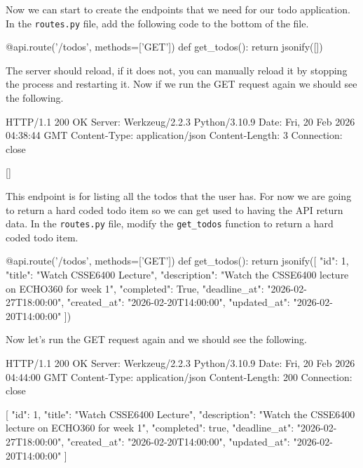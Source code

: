 \documentclass{csse4400}
\begin{document}
Now we can start to create the endpoints that we need for our todo application.
In the \texttt{routes.py} file, add the following code to the bottom of the file.

\begin{code}[language=python]{}
  @api.route('/todos', methods=['GET'])
  def get_todos():
      return jsonify([])
\end{code}

The server should reload, if it does not, you can manually reload it by stopping the process and restarting it.
Now if we run the GET request again we should see the following.

\begin{code}[language=json,numbers=none]{}
  HTTP/1.1 200 OK
  Server: Werkzeug/2.2.3 Python/3.10.9
  Date: Fri, 20 Feb 2026 04:38:44 GMT
  Content-Type: application/json
  Content-Length: 3
  Connection: close
  
  []
\end{code}

This endpoint is for listing all the todos that the user has.
For now we are going to return a hard coded todo item so we can get used to having the API return data.
In the \texttt{routes.py} file, modify the \texttt{get\_todos} function to return a hard coded todo item.

\begin{code}[language=python]{}
  @api.route('/todos', methods=['GET'])
  def get_todos():
      return jsonify([{
        "id": 1,
        "title": "Watch CSSE6400 Lecture",
        "description": "Watch the CSSE6400 lecture on ECHO360 for week 1",
        "completed": True,
        "deadline_at": "2026-02-27T18:00:00",
        "created_at": "2026-02-20T14:00:00",
        "updated_at": "2026-02-20T14:00:00"
      }])
\end{code}

Now let's run the GET request again and we should see the following.

\begin{code}[language=json,numbers=none]{}
  HTTP/1.1 200 OK
  Server: Werkzeug/2.2.3 Python/3.10.9
  Date: Fri, 20 Feb 2026 04:44:00 GMT
  Content-Type: application/json
  Content-Length: 200
  Connection: close
  
  [
    {
      "id": 1,
      "title": "Watch CSSE6400 Lecture",
      "description": "Watch the CSSE6400 lecture on ECHO360 for week 1",
      "completed": true,
      "deadline_at": "2026-02-27T18:00:00",
      "created_at": "2026-02-20T14:00:00",
      "updated_at": "2026-02-20T14:00:00"
    }
  ]
\end{code}
\end{document}
